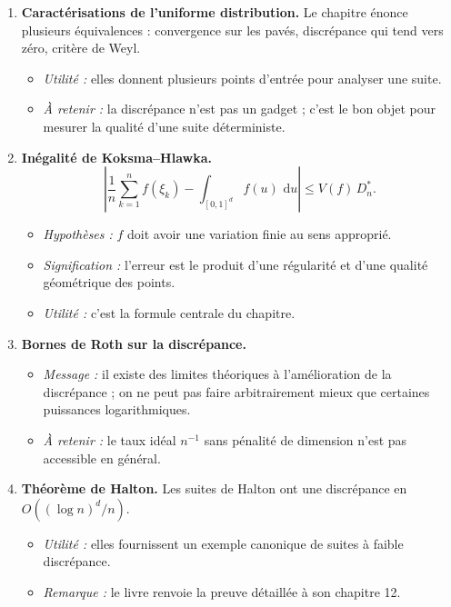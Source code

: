 \documentclass[11pt,a4paper]{article}
\newcommand{\ud}{\,\mathrm{d}}
\begin{document}
\begin{enumerate}[label=\textbf{\arabic*.}]
  \item \textbf{Caractérisations de l'uniforme distribution.} Le chapitre énonce plusieurs équivalences : convergence sur les pavés, discrépance qui tend vers zéro, critère de Weyl.
  \begin{itemize}
    \item \emph{Utilité :} elles donnent plusieurs points d'entrée pour analyser une suite.
    \item \emph{À retenir :} la discrépance n'est pas un gadget ; c'est le bon objet pour mesurer la qualité d'une suite déterministe.
  \end{itemize}

  \item \textbf{Inégalité de Koksma--Hlawka.}
  \[
    \left|\frac1n\sum_{k=1}^n f(\xi_k)-\int_{[0,1]^d} f(u)\,\ud u\right|
    \le V(f)\,D_n^\ast.
  \]
  \begin{itemize}
    \item \emph{Hypothèses :} $f$ doit avoir une variation finie au sens approprié.
    \item \emph{Signification :} l'erreur est le produit d'une régularité et d'une qualité géométrique des points.
    \item \emph{Utilité :} c'est la formule centrale du chapitre.
  \end{itemize}

  \item \textbf{Bornes de Roth sur la discrépance.}
  \begin{itemize}
    \item \emph{Message :} il existe des limites théoriques à l'amélioration de la discrépance ; on ne peut pas faire arbitrairement mieux que certaines puissances logarithmiques.
    \item \emph{À retenir :} le taux idéal $n^{-1}$ sans pénalité de dimension n'est pas accessible en général.
  \end{itemize}

  \item \textbf{Théorème de Halton.} Les suites de Halton ont une discrépance en $O((\log n)^d/n)$.
  \begin{itemize}
    \item \emph{Utilité :} elles fournissent un exemple canonique de suites à faible discrépance.
    \item \emph{Remarque :} le livre renvoie la preuve détaillée à son chapitre 12.
  \end{itemize}


\end{enumerate}
\end{document}
